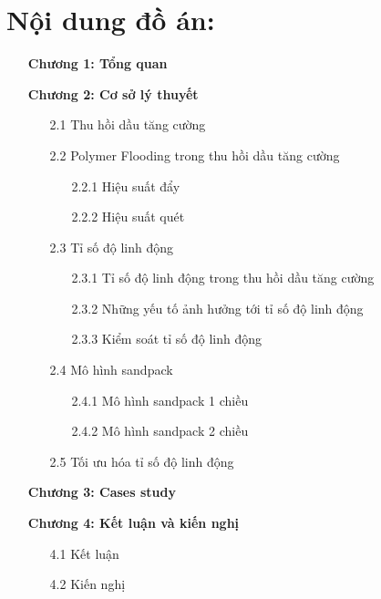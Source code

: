 \documentclass[12pt,a4paper]{article}
\begin{document}
\section{Nội dung đồ án:}
	\begin{enumerate}
		\item[] \textbf{Chương 1: Tổng quan}
		
		\item[] \textbf{Chương 2: Cơ sở lý thuyết}
		\begin{enumerate}
			\item[2.1] Thu hồi dầu tăng cường
			\item[2.2] Polymer Flooding trong thu hồi dầu tăng cường
				\begin{enumerate}
					\item[2.2.1] Hiệu suất đẩy
					\item[2.2.2] Hiệu suất quét
				\end{enumerate}
			\item[2.3] Tỉ số độ linh động
				\begin{enumerate}
					\item[2.3.1] Tỉ số độ linh động trong thu hồi dầu tăng cường
					\item[2.3.2] Những yếu tố ảnh hưởng tới tỉ số độ linh động
					\item[2.3.3] Kiểm soát tỉ số độ linh động
				\end{enumerate}
			\item[2.4] Mô hình sandpack
				\begin{enumerate}
					\item[2.4.1] Mô hình sandpack 1 chiều
					\item[2.4.2] Mô hình sandpack 2 chiều
				\end{enumerate}
			\item[2.5] Tối ưu hóa tỉ số độ linh động 
		\end{enumerate}
		\item[] \textbf{Chương 3: Cases study}
		\item[] \textbf{Chương 4: Kết luận và kiến nghị}
			\begin{enumerate}
				\item[4.1] Kết luận
				\item[4.2] Kiến nghị
			\end{enumerate}
	\end{enumerate}
\end{document}

